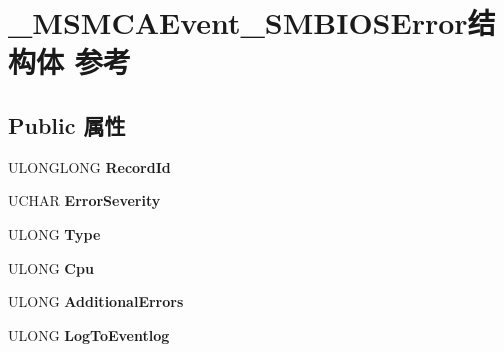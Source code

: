 \hypertarget{struct___m_s_m_c_a_event___s_m_b_i_o_s_error}{}\section{\+\_\+\+M\+S\+M\+C\+A\+Event\+\_\+\+S\+M\+B\+I\+O\+S\+Error结构体 参考}
\label{struct___m_s_m_c_a_event___s_m_b_i_o_s_error}
\subsection*{Public 属性}
\begin{DoxyCompactItemize}
\item 
\mbox{\label{struct___m_s_m_c_a_event___s_m_b_i_o_s_error_a7b3754ae4fea69ffd5b1129a0b36ffb3}} 
U\+L\+O\+N\+G\+L\+O\+NG {\bfseries Record\+Id}
\item 
\mbox{\label{struct___m_s_m_c_a_event___s_m_b_i_o_s_error_ab6d8129e81b64dc174c89d7f31f3ccb6}} 
U\+C\+H\+AR {\bfseries Error\+Severity}
\item 
\mbox{\label{struct___m_s_m_c_a_event___s_m_b_i_o_s_error_a9d0e560a6d30306a8b6cb6c57a59088d}} 
U\+L\+O\+NG {\bfseries Type}
\item 
\mbox{\label{struct___m_s_m_c_a_event___s_m_b_i_o_s_error_a091cd0904d5b579fd95ba2d7350a592b}} 
U\+L\+O\+NG {\bfseries Cpu}
\item 
\mbox{\label{struct___m_s_m_c_a_event___s_m_b_i_o_s_error_a4bc604a5a4c886c855355802be681112}} 
U\+L\+O\+NG {\bfseries Additional\+Errors}
\item 
\mbox{\label{struct___m_s_m_c_a_event___s_m_b_i_o_s_error_a576c4526f83fcdbdffee2a4fde6ccf6b}} 
U\+L\+O\+NG {\bfseries Log\+To\+Eventlog}
\item 
\mbox{\label{struct___m_s_m_c_a_event___s_m_b_i_o_s_error_ad55ed3e87a16d3d2bd6d9f46936c923d}} 

\end{DoxyCompactItemize}
